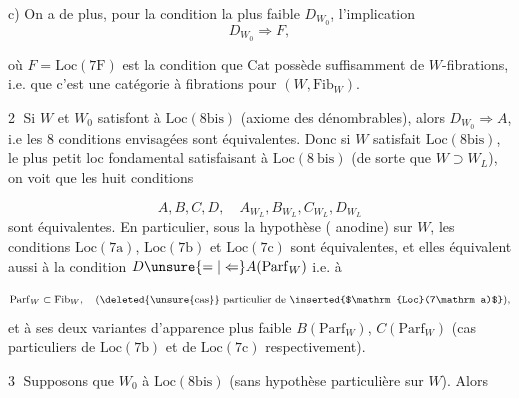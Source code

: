 
c) On a de plus, pour la condition la plus faible $D_{W_0}$, l'implication
\[
 D_{W_0}\Longrightarrow F,
\]

où $F=\mathrm{Loc}(7\mathrm F)$ est la condition que $\mathrm{Cat}$ possède suffisamment de $W$-fibrations, i.e. que c'est une catégorie à fibrations pour $(W,\mathrm{Fib}_W)$.

\textcircled{2} Si $W$ et $W_0$ satisfont à $\mathrm{Loc}(8\mathrm{bis})$ (axiome des  dénombrables), alors  $D_{W_0}\Longrightarrow A$, i.e les 8 conditions envisagées sont équivalentes. Donc si $W$ satisfait $\mathrm{Loc}(8\mathrm{bis})$,  le plus petit loc fondamental  satisfaisant à $\mathrm{Loc}(8\ \mathrm{bis})$ (de sorte que $W\supset W_L$), on voit que les huit conditions

\[
 A,B,C,D,\quad A_{W_L},B_{W_L},C_{W_L},D_{W_L}
\]
sont équivalentes. En particulier, sous la hypothèse ( anodine) sur $W$, les conditions  $\mathrm{Loc}(7\mathrm a)$, $\mathrm{Loc}(7\mathrm b)$ et $\mathrm{Loc}(7\mathrm c)$ sont équivalentes, et elles équivalent aussi à la condition $D\unsure{=|\Leftarrow}A(\mathrm{Parf}_W)$ i.e. à

\[
 \mathrm{Parf}_W\subset\mathrm{Fib}_W,\quad\text{(\deleted{\unsure{cas}} particulier de \inserted{$\mathrm{Loc}(7\mathrm a)$}),}
\]
et à ses deux variantes  d'apparence plus faible $B(\mathrm{Parf}_W)$, $C(\mathrm{Parf}_W)$ (cas particuliers de $\mathrm{Loc}(7\mathrm b)$ et de $\mathrm{Loc}(7\mathrm c)$ respectivement).

\textcircled{3} Supposons que $W_0$  à $\mathrm{Loc}(8\mathrm{bis})$ (sans hypothèse particulière sur $W$). Alors

